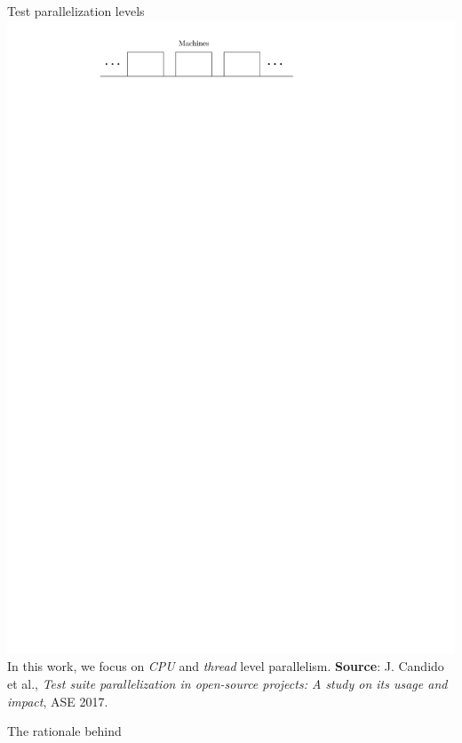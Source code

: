 \documentclass{beamer}
\begin{document}
{\begin{frame}{Test parallelization levels}
	\centering
	\includegraphics[width=\linewidth,page=3]{images/intro.pdf}
	\vfill
	{\color{black}In this work, we focus on \textit{CPU} and \textit{thread} level parallelism.}
	\vfill
	\vfill
	{\fontsize{5}{5}\selectfont\textbf{Source}: J. Candido et al., \textit{Test suite parallelization in open-source projects: A study on its usage and impact}, ASE 2017.}
\end{frame}

\begin{frame}{The rationale behind \textbf{\tname}}
	

\end{frame}}
\end{document}
